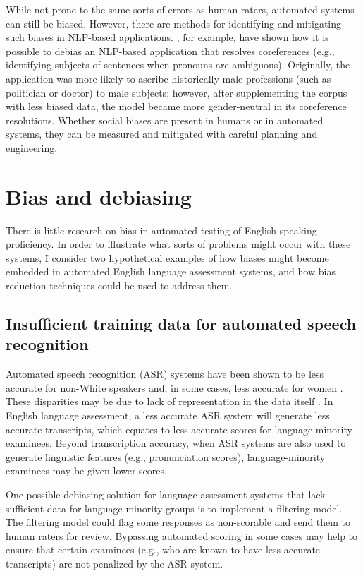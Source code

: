 \documentclass [PhD] {uclathes}
\begin{document}
While not prone to the same sorts of errors as human raters, automated systems can still be biased. However, there are methods for identifying and mitigating such biases in NLP-based applications. \citet{zhao2018gender}, for example, have shown how it is possible to debias an NLP-based application that resolves coreferences (e.g., identifying subjects of sentences when pronouns are ambiguous). Originally, the application was more likely to ascribe historically male professions (such as politician or doctor) to male subjects; however, after supplementing the corpus with less biased data, the model became more gender-neutral in its coreference resolutions. Whether social biases are present in humans or in automated systems, they can be measured and mitigated with careful planning and engineering.

\section{Bias and debiasing}

There is little research on bias in automated testing of English speaking proficiency. In order to illustrate what sorts of problems might occur with these systems, I consider two hypothetical examples of how biases might become embedded in automated English language assessment systems, and how bias reduction techniques could be used to address them.

\subsection{Insufficient training data for automated speech recognition}

Automated speech recognition (ASR) systems have been shown to be less accurate for non-White speakers \citep{koenecke2020} and, in some cases, less accurate for women \citep{tatman2017a, tatman2017b}. These disparities may be due to lack of representation in the data itself \citep[e.g.][]{zhao2018gender}. In English language assessment, a less accurate ASR system will generate less accurate transcripts, which equates to less accurate scores for language-minority examinees. Beyond transcription accuracy, when ASR systems are also used to generate linguistic features (e.g., pronunciation scores), language-minority examinees may be given lower scores.

One possible debiasing solution for language assessment systems that lack sufficient data for language-minority groups is to implement a filtering model. The filtering model could flag some responses as non-scorable and send them to human raters for review. Bypassing automated scoring in some cases may help to ensure that certain examinees (e.g., who are known to have less accurate transcripts) are not penalized by the ASR system.
\end{document}
